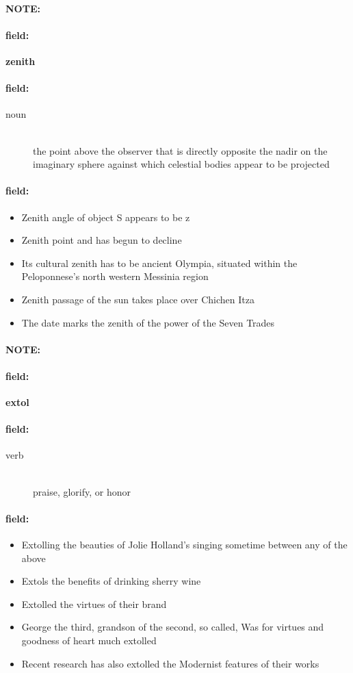 \documentclass[12pt]{article}
\newenvironment{note}{\paragraph{NOTE:}}{}
\newenvironment{field}{\paragraph{field:}}{}
\begin{document}
\begin{note}
\begin{field}
\textbf{\large zenith}
\end{field}


\begin{field}
\begin{description}
\item[noun] \hfill \\ 
the point above the observer that is directly opposite the nadir on the imaginary sphere against which celestial bodies appear to be projected

\end{description}
\end{field}

\begin{field}
\begin{itemize}
\item Zenith angle of object S appears to be z 
\item Zenith point and has begun to decline
\item Its cultural zenith has to be ancient Olympia, situated within the Peloponnese's north western Messinia region
\item Zenith passage of the sun takes place over Chichen Itza
\item The date marks the zenith of the power of the Seven Trades
\end{itemize}
\end{field}
\end{note}
\begin{note}
\begin{field}
\textbf{\large extol}
\end{field}


\begin{field}
\begin{description}
\item[verb] \hfill \\ 
praise, glorify, or honor

\end{description}
\end{field}

\begin{field}
\begin{itemize}
\item Extolling the beauties of Jolie Holland's singing sometime between any of the above
\item Extols the benefits of drinking sherry wine
\item Extolled the virtues of their brand
\item George the third, grandson of the second, so called, Was for virtues and goodness of heart much extolled
\item Recent research has also extolled the Modernist features of their works
\end{itemize}
\end{field}
\end{note}
\end{document}
